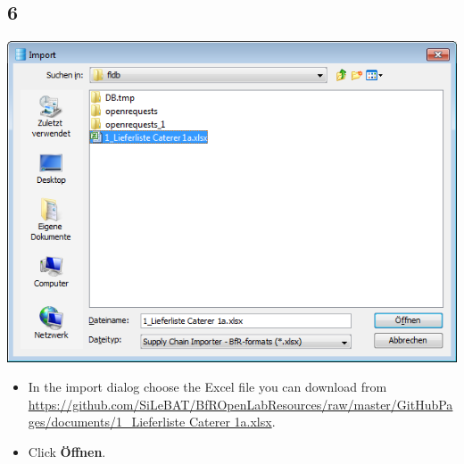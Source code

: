 \documentclass{beamer}
\begin{document}
\subsection{6}
\begin{frame}
	\begin{center}
  		\includegraphics[height=0.6\textheight]{6.png}
	\end{center}
	\begin{itemize}
		\item In the import dialog choose the Excel file you can download from  \url{https://github.com/SiLeBAT/BfROpenLabResources/raw/master/GitHubPages/documents/1_Lieferliste Caterer 1a.xlsx}.
		\item Click \textbf{Öffnen}.
	\end{itemize}
\end{frame}
\end{document}
